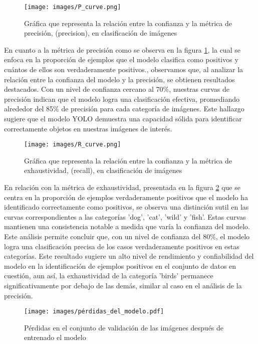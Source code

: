 \documentclass[journal]{IEEEtran}
\begin{document}
\begin{figure}[!h]
  \centering
  \texttt{[image: images/P\_curve.png]}
  \caption{Gráfica que representa la relación entre la confianza y la métrica de precisión, (precision), en clasificación de imágenes}
  \label{presicion}
\end{figure}

En cuanto a la métrica de precisión como se observa en la figura \ref{presicion}, la cual se enfoca en la proporción de ejemplos que el modelo clasifica como positivos y cuántos de ellos son verdaderamente positivos., observamos que, al analizar la relación entre la confianza del modelo y la precisión, se obtienen resultados destacados. Con un nivel de confianza cercano al 70\%, nuestras curvas de precisión indican que el modelo logra una clasificación efectiva, promediando alrededor del 85\% de precisión para cada categoría de imágenes. Este hallazgo sugiere que el modelo YOLO demuestra una capacidad sólida para identificar correctamente objetos en nuestras imágenes de interés.
\begin{figure}[!h]
  \centering
  \texttt{[image: images/R\_curve.png]}
  \caption{Gráfica que representa la relación entre la confianza y la métrica de exhaustividad, (recall), en clasificación de imágenes}
  \label{metrica}
\end{figure}

En relación con la métrica de exhaustividad, presentada en la figura \ref{metrica} que se centra en la proporción de ejemplos verdaderamente positivos que el modelo ha identificado correctamente como positivos, se observa una distinción sutil en las curvas correspondientes a las categorías 'dog', 'cat', 'wild' y 'fish'. Estas curvas mantienen una consistencia notable a medida que varía la confianza del modelo. Este análisis permite concluir que, con un nivel de confianza del 80\%, el modelo logra una clasificación precisa de los casos verdaderamente positivos en estas categorías. Este resultado sugiere un alto nivel de rendimiento y confiabilidad del modelo en la identificación de ejemplos positivos en el conjunto de datos en cuestión, aun así, la exhaustividad de la categoría 'birds' permanece significativamente por debajo de las demás, similar al caso en el análisis de la precisión.

\begin{figure}[!h]
  \centering
  \texttt{[image: images/pérdidas\_del\_modelo.pdf]}
  \caption{Pérdidas en el conjunto de validación de las imágenes después de entrenado el modelo}
  \label{grafico_loss}
\end{figure}
\end{document}
